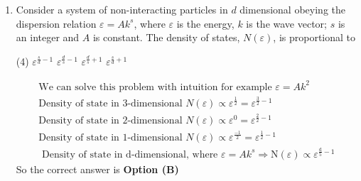 \begin{enumerate}
\begin{tasks}(4)
\task[\textbf{A.}] (a) $N k_{B} T / 2$
\task[\textbf{B.}] $3 N k_{B} T / 2$
\task[\textbf{C.}] $2 N k_{B} T$
\task[\textbf{D.}] $5 N k_{B} T / 2$
\end{tasks}
\begin{answer}
\begin{align*}
Z&=\frac{1}{h^{3}} \int e^{-\beta H} d p_{x} d p_{y} d p_{z} d x d y d z\\
Z&=\int_{-\infty}^{\infty} e^{\frac{-p_{x}^{2}}{2 m k_{B} T}} d p_{x} \int_{-\infty}^{\infty} e^{\frac{-p_{y}^{2}}{2 m k_{B} T}} d p_{y} \int_{-\infty}^{\infty} e^{\frac{-p_{z}^{2}}{2 m k_{B} T}} d p_{z} \int d x d y \int_{0}^{L} e^{-\frac{m g z}{k_{B} T}} d z\\
Z&=\pi R^{2}\left(\frac{m k_{B} T}{2 \pi \hbar^{2}}\right)^{\frac{3}{2}} \int_{0}^{L} e^{-\frac{m g z}{k_{B} T}} d z \Rightarrow Z\\&=\pi R^{2}\left(\frac{m k_{B} T}{2 \pi \hbar^{2}}\right)^{\frac{3}{2}}\left(\frac{1-e^{-\frac{m g L}{k_{B} T}}}{\frac{m g}{k_{B} T}}\right)\\
Z_{N}&=Z^{N}\\
\Rightarrow\langle E\rangle&=k_{B} T^{2} \frac{\partial \ln z}{\partial T}=\frac{5 N k_{B} T}{2},\text{ since }m g L>>k_{B} T
\end{align*}
So the correct answer is \textbf{Option (D)}
\end{answer}
\item Consider a system of non-interacting particles in $d$ dimensional obeying the dispersion relation $\varepsilon=A k^{s}$, where $\varepsilon$ is the energy, $k$ is the wave vector; $s$ is an integer and $A$ is constant. The density of states, $N(\varepsilon)$, is proportional to
{}

\begin{tasks}(4)
\task[\textbf{A.}] $\varepsilon^{\frac{s}{d}-1}$
\task[\textbf{B.}] $\varepsilon^{\frac{d}{s}-1}$
\task[\textbf{C.}] $\varepsilon^{\frac{d}{s}+1}$
\task[\textbf{D.}] $\varepsilon^{\frac{s}{d}+1}$
\end{tasks}
\begin{answer}
\begin{align*}
\text{We can solve this problem with intuition for example $\varepsilon=A k^{2}$}\\
\text{Density of state in 3-dimensional $N(\varepsilon) \propto \varepsilon^{\frac{1}{2}}=\varepsilon^{\frac{3}{2}-1}$}\\
\text{Density of state in 2-dimensional $N(\varepsilon) \propto \varepsilon^{0}=\varepsilon^{\frac{2}{2}-1}$}\\
\text{Density of state in 1-dimensional $N(\varepsilon) \propto \varepsilon^{\frac{-1}{2}}=\varepsilon^{\frac{1}{2}-1}$}\\
\text{	Density of state in d-dimensional, where $\varepsilon=A k^{s} \Rightarrow \mathrm{N}(\varepsilon) \propto \varepsilon^{\frac{\mathrm{d}}{5}-1}$}
\end{align*}
So the correct answer is \textbf{Option (B)}
\end{answer}


\end{enumerate}
